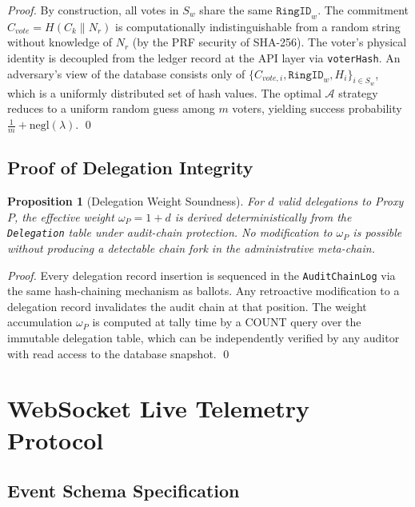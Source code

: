 \documentclass[journal,10pt,twocolumn]{IEEEtran}
\newtheorem{proposition}{Proposition}
\begin{document}
\begin{proof}
By construction, all votes in $S_w$ share the same $\mathtt{RingID}_{w}$. The commitment $C_{vote} = H(C_k \| N_r)$ is computationally indistinguishable from a random string without knowledge of $N_r$ (by the PRF security of SHA-256). The voter's physical identity is decoupled from the ledger record at the API layer via \texttt{voterHash}. An adversary's view of the database consists only of $\{C_{vote,i}, \mathtt{RingID}_w, H_i\}_{i \in S_w}$, which is a uniformly distributed set of hash values. The optimal $\mathcal{A}$ strategy reduces to a uniform random guess among $m$ voters, yielding success probability $\frac{1}{m} + \mathrm{negl}(\lambda)$. \qed
\end{proof}

\subsection{Proof of Delegation Integrity}

\begin{proposition}[Delegation Weight Soundness]
For $d$ valid delegations to Proxy $P$, the effective weight $\omega_P = 1 + d$ is derived deterministically from the \texttt{Delegation} table under audit-chain protection. No modification to $\omega_P$ is possible without producing a detectable chain fork in the administrative meta-chain.
\end{proposition}

\begin{proof}
Every delegation record insertion is sequenced in the \texttt{AuditChainLog} via the same hash-chaining mechanism as ballots. Any retroactive modification to a delegation record invalidates the audit chain at that position. The weight accumulation $\omega_P$ is computed at tally time by a COUNT query over the immutable delegation table, which can be independently verified by any auditor with read access to the database snapshot. \qed
\end{proof}

\section{WebSocket Live Telemetry Protocol}

\subsection{Event Schema Specification}
\end{document}
